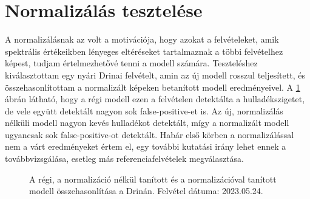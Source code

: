 \section{Normalizálás tesztelése}
\label{ch:normalization-test} 

A normalizálásnak az volt a motivációja, hogy azokat a felvételeket, amik spektrális értékeikben lényeges eltéréseket tartalmaznak a többi felvételhez képest, tudjam értelmezhetővé tenni a modell számára. Teszteléshez kiválasztottam egy nyári Drinai felvételt, amin az új modell rosszul teljesített, és összehasonlítottam a normalizált képeken betanított modell eredményeivel. A \ref{fig:normal-vs-normalized-vs-old} ábrán látható, hogy a régi modell ezen a felvételen detektálta a hulladékszigetet, de vele együtt detektált nagyon sok false-positive-et is. Az új, normalizálás nélküli modell nagyon kevés hulladékot detektált, mígy a normalizált modell ugyancsak sok false-positive-ot detektált. Habár első körben a normalizálással nem a várt eredményeket értem el, egy további kutatási irány lehet ennek a továbbvizsgálása, esetleg más referenciafelvételek megválasztása.

\begin{figure}[H]
	\centering
	\hspace{5pt}
	\hspace{5pt}
	\caption{A régi, a normalizáció nélkül tanított és a normalizációval tanított modell összehasonlítása a Drinán. Felvétel dátuma: 2023.05.24.}
	\label{fig:normal-vs-normalized-vs-old}
\end{figure}
